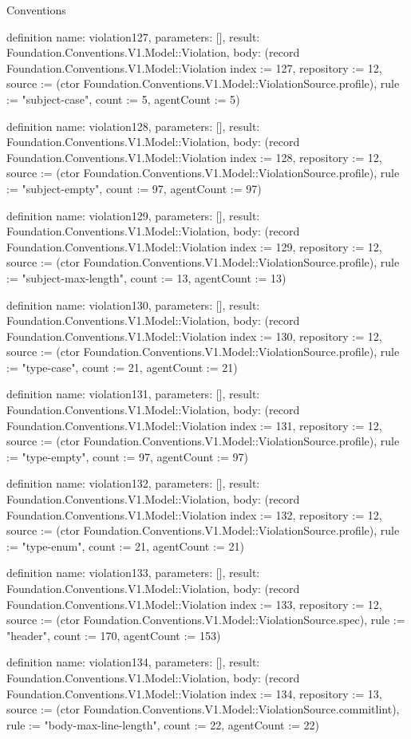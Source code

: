 \begin{lexlean}{Conventions}
\begin{semanticmodule}
definition{
  name: violation127,
  parameters: [],
  result: Foundation.Conventions.V1.Model::Violation,
  body: (record Foundation.Conventions.V1.Model::Violation {index := 127, repository := 12, source := (ctor Foundation.Conventions.V1.Model::ViolationSource.profile), rule := "subject-case", count := 5, agentCount := 5})
}

definition{
  name: violation128,
  parameters: [],
  result: Foundation.Conventions.V1.Model::Violation,
  body: (record Foundation.Conventions.V1.Model::Violation {index := 128, repository := 12, source := (ctor Foundation.Conventions.V1.Model::ViolationSource.profile), rule := "subject-empty", count := 97, agentCount := 97})
}

definition{
  name: violation129,
  parameters: [],
  result: Foundation.Conventions.V1.Model::Violation,
  body: (record Foundation.Conventions.V1.Model::Violation {index := 129, repository := 12, source := (ctor Foundation.Conventions.V1.Model::ViolationSource.profile), rule := "subject-max-length", count := 13, agentCount := 13})
}

definition{
  name: violation130,
  parameters: [],
  result: Foundation.Conventions.V1.Model::Violation,
  body: (record Foundation.Conventions.V1.Model::Violation {index := 130, repository := 12, source := (ctor Foundation.Conventions.V1.Model::ViolationSource.profile), rule := "type-case", count := 21, agentCount := 21})
}

definition{
  name: violation131,
  parameters: [],
  result: Foundation.Conventions.V1.Model::Violation,
  body: (record Foundation.Conventions.V1.Model::Violation {index := 131, repository := 12, source := (ctor Foundation.Conventions.V1.Model::ViolationSource.profile), rule := "type-empty", count := 97, agentCount := 97})
}

definition{
  name: violation132,
  parameters: [],
  result: Foundation.Conventions.V1.Model::Violation,
  body: (record Foundation.Conventions.V1.Model::Violation {index := 132, repository := 12, source := (ctor Foundation.Conventions.V1.Model::ViolationSource.profile), rule := "type-enum", count := 21, agentCount := 21})
}

definition{
  name: violation133,
  parameters: [],
  result: Foundation.Conventions.V1.Model::Violation,
  body: (record Foundation.Conventions.V1.Model::Violation {index := 133, repository := 12, source := (ctor Foundation.Conventions.V1.Model::ViolationSource.spec), rule := "header", count := 170, agentCount := 153})
}

definition{
  name: violation134,
  parameters: [],
  result: Foundation.Conventions.V1.Model::Violation,
  body: (record Foundation.Conventions.V1.Model::Violation {index := 134, repository := 13, source := (ctor Foundation.Conventions.V1.Model::ViolationSource.commitlint), rule := "body-max-line-length", count := 22, agentCount := 22})
}


\end{semanticmodule}
\end{lexlean}
